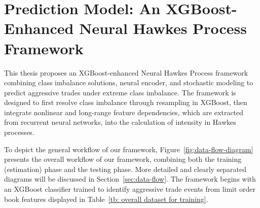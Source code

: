 


\section{Prediction Model: An XGBoost-Enhanced Neural Hawkes Process Framework}
This thesis proposes an XGBoost-enhanced Neural Hawkes Process framework combining class imbalance solutions, neural encoder, and stochastic modeling to predict aggressive trades under extreme class imbalance. The framework is designed to first resolve class imbalance through resampling in XGBoost, then integrate nonlinear and long-range feature dependencies, which are extracted from recurrent neural networks, into the calculation of intensity in Hawkes processes. 

To depict the general workflow of our framework, Figure~\ref{fig:data-flow-diagram} presents the overall workflow of our framework, combining both the training (estimation) phase and the testing phase. More detailed and clearly separated diagrams will be discussed in Section~\ref{sec:data-flow}. The framework begins with an XGBoost classifier trained to identify aggressive trade events from limit order book features displayed in Table~\ref{tb: overall dataset for training}. 

